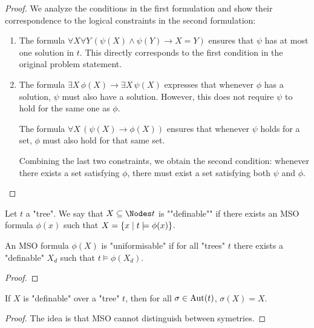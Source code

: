 \documentclass[a4paper,UKenglish,cleveref, autoref, thm-restate]{lipics-v2021}
\begin{document}
	\begin{proof}
		We analyze the conditions in the first formulation and show their correspondence to the logical constraints in the second formulation:

		\begin{enumerate}
			\item The formula $\forall X \forall Y \, (\psi(X) \land \psi(Y) \rightarrow X = Y)$ ensures that $\psi$ has at most one solution
			      in $t$. This directly corresponds to the first condition in the original problem statement.

			\item The formula $\exists X \, \phi(X) \rightarrow \exists X \, \psi(X)$ expresses that whenever $\phi$ has a solution, $\psi$ must also have a solution.
			      However, this does not require $\psi$ to hold for the same one as $\phi$.

			      The formula $\forall X \, (\psi(X) \rightarrow \phi(X))$ ensures that whenever $\psi$ holds for a set, $\phi$ must also hold for that same set.

			      Combining the last two constraints, we obtain the second condition: whenever there exists a set satisfying $\phi$, there must exist a set
			      satisfying both $\psi$ and $\phi$.
		\end{enumerate}
	\end{proof}
\fi

\begin{definition}\label{def:definable}
	Let $t$ a "tree". We say that $X \subseteq \Nodes t$ is ""definable"" if there exists an MSO formula $\phi(x)$ such that $ X = \left\{x \mid t \models \phi(x)\right\}$.
\end{definition}

\begin{lemma}
	An MSO formula $\phi(X)$ is "uniformisable" if for all "trees" $t$ there exists a "definable" $X_d$ such that $t \models \phi(X_d)$.
\end{lemma}

\begin{proof}
\end{proof}



\begin{lemma}\label{lem:def-aut}
	If $X$ is "definable" over a "tree" $t$, then for all $\sigma \in \text{Aut}(t)$, $\sigma(X) = X$.
\end{lemma}

\begin{proof}
	\todo{~}
    The idea is that MSO cannot distinguish between symetries.
\end{proof}
\end{document}
